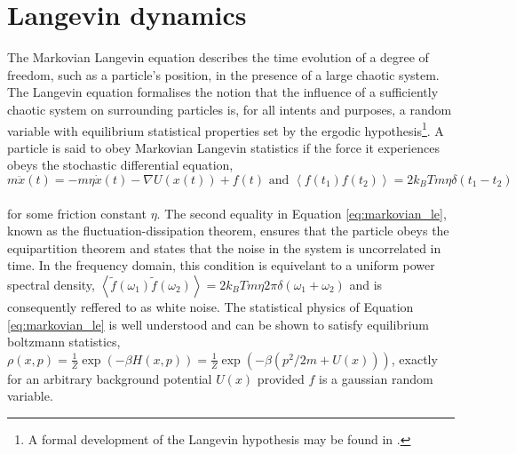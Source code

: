 \documentclass{article}
\begin{document}
\section{Langevin dynamics}

The Markovian Langevin equation describes the time evolution of a degree of freedom, such as a particle's position, in the presence of a large chaotic system. The Langevin equation formalises the notion that the influence of a sufficiently chaotic system on surrounding particles is, for all intents and purposes, a random variable with equilibrium statistical properties set by the ergodic hypothesis\footnote{A formal development of the Langevin hypothesis may be found in \cite{Kramers}.}. A particle is said to obey Markovian Langevin statistics if the force it experiences obeys the stochastic differential equation,
\\
\begin{equation}
	\label{eq:markovian_le}
	m\ddot{x}(t)=-m\eta\dot{x}(t) - \nabla U(x(t)) + f(t) \text{ and } \left<f(t_1)f(t_2)\right>=2k_BTm\eta\delta(t_1 - t_2)
\end{equation}
\\
for some friction constant $\eta$. The second equality in Equation \ref{eq:markovian_le}, known as the fluctuation-dissipation theorem, ensures that the particle obeys the equipartition theorem and states that the noise in the system is uncorrelated in time. In the frequency domain, this condition is equivelant to a uniform power spectral density, $\left<\tilde{f}(\omega_1)\tilde{f}(\omega_2)\right>=2k_BTm\eta2\pi\delta(\omega_1 + \omega_2)$ and is consequently reffered to as white noise. The statistical physics of Equation \ref{eq:markovian_le} is well understood and can be shown to satisfy equilibrium boltzmann statistics, $\rho(x, p)=\frac{1}{Z}\exp(-\beta H(x, p))=\frac{1}{Z}\exp(-\beta(p^2/2m + U(x)))$, exactly for an arbitrary background potential $U(x)$ provided $f$ is a gaussian random variable.
\end{document}
